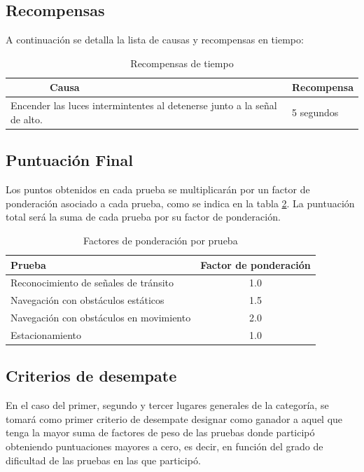 \documentclass[letterpaper,12pt]{article}
\begin{document}
\subsection{Recompensas}
\label{sec:bonuses}
A continuación se detalla la lista de causas y recompensas en tiempo:
\begin{table}[h!]
  \centering
  \begin{tabular}{|p{}|p{}|}
    \hline
    $\qquad\qquad$Causa & Recompensa\\
    \hline
    Encender las luces intermintentes al detenerse junto a la señal de alto. & 5 segundos\\
    \hline
  \end{tabular}
  \caption{Recompensas de tiempo}
  \label{tab:bonuses}
\end{table}

\subsection{Puntuación Final}
\label{sec:final_score}
Los puntos obtenidos en cada prueba se multiplicarán por un factor de ponderación asociado a cada prueba, como se indica en la tabla \ref{tab:weights}. La puntuación total será la suma de cada prueba por su factor de ponderación.

\begin{table}[h!]
  \centering
  \begin{tabular}{|l|c|}
    \hline
    Prueba & Factor de ponderación\\
    \hline
    Reconocimiento de señales de tránsito & 1.0 \\
    \hline
    Navegación con obstáculos estáticos & 1.5 \\
    \hline
    Navegación con obstáculos en movimiento & 2.0 \\
    \hline
    Estacionamiento & 1.0\\
    \hline
  \end{tabular}
  \caption{Factores de ponderación por prueba}
  \label{tab:weights}
\end{table}


\subsection{Criterios de desempate}
En el caso del primer, segundo y tercer lugares generales de la categoría, se tomará como primer criterio de desempate designar como ganador a aquel que tenga la mayor suma de factores de peso de las pruebas donde participó obteniendo puntuaciones mayores a cero, es decir, en función del grado de dificultad de las pruebas en las que participó.
\end{document}

